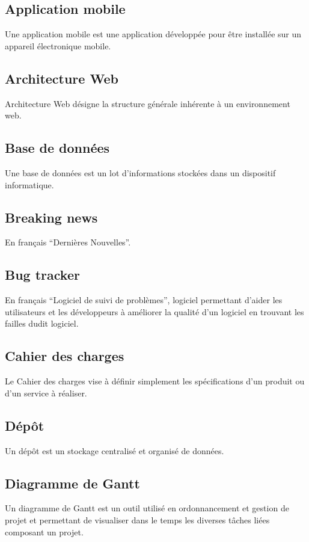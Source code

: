 \documentclass{life-fr}
\begin{document}
\subsection{ Application mobile}
Une application mobile est une application développée pour être installée sur un appareil électronique mobile.

\subsection{ Architecture Web}
Architecture Web désigne la structure générale inhérente à un environnement web.

\subsection{ Base de données}
Une base de données est un lot d'informations stockées dans un dispositif informatique.

\subsection{ Breaking news}
En français ``Dernières Nouvelles''.

\subsection{ Bug tracker}
En français ``Logiciel de suivi de problèmes'',  logiciel permettant d'aider les utilisateurs et les développeurs à améliorer la qualité d'un logiciel en trouvant les failles dudit logiciel.

\subsection{ Cahier des charges}
Le Cahier des charges vise à définir simplement les spécifications d’un produit ou d’un service à réaliser.

\subsection{ Dépôt}
Un dépôt est un stockage centralisé et organisé de données.

\subsection{ Diagramme de Gantt}
Un diagramme de Gantt est un outil utilisé en ordonnancement et gestion de projet et permettant de visualiser dans le temps les diverses tâches liées composant un projet.
\end{document}
